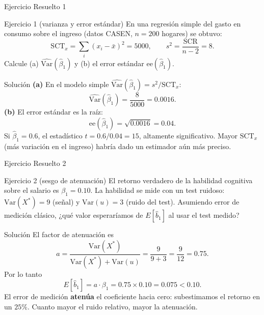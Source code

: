 \documentclass[10pt]{beamer}
\begin{document}
\begin{frame}{Ejercicio Resuelto 1}

\begin{block}{Ejercicio 1 (varianza y error estándar)}
En una regresión simple del gasto en consumo sobre el ingreso (datos CASEN, $n=200$ hogares) se obtuvo:
\[
\text{SCT}_x=\sum_i(x_i-\bar x)^2=5000, \qquad s^2=\frac{\text{SCR}}{n-2}=8.
\]
Calcule (a) $\widehat{\text{Var}}(\hat\beta_1)$ y (b) el error estándar $\text{ee}(\hat\beta_1)$.
\end{block}

\pause

\begin{exampleblock}{Solución}
\textbf{(a)} En el modelo simple $\widehat{\text{Var}}(\hat\beta_1)=s^2/\text{SCT}_x$:
\[
\widehat{\text{Var}}(\hat\beta_1)=\frac{8}{5000}=0.0016.
\]
\textbf{(b)} El error estándar es la raíz:
\[
\text{ee}(\hat\beta_1)=\sqrt{0.0016}=0.04.
\]
Si $\hat\beta_1=0.6$, el estadístico $t=0.6/0.04=15$, altamente significativo. Mayor $\text{SCT}_x$ (más variación en el ingreso) habría dado un estimador aún más preciso.
\end{exampleblock}

\end{frame}

\begin{frame}{Ejercicio Resuelto 2}

\begin{block}{Ejercicio 2 (sesgo de atenuación)}
El retorno verdadero de la habilidad cognitiva sobre el salario es $\beta_1=0.10$. La habilidad se mide con un test ruidoso: $\text{Var}(X^*)=9$ (señal) y $\text{Var}(u)=3$ (ruido del test). Asumiendo error de medición clásico, ¿qué valor esperaríamos de $E[\hat b_1]$ al usar el test medido?
\end{block}

\pause

\begin{exampleblock}{Solución}
El factor de atenuación es
\[
a=\frac{\text{Var}(X^*)}{\text{Var}(X^*)+\text{Var}(u)}=\frac{9}{9+3}=\frac{9}{12}=0.75.
\]
Por lo tanto
\[
E[\hat b_1]=a\cdot\beta_1=0.75\times 0.10=0.075<0.10.
\]
El error de medición \textbf{atenúa} el coeficiente hacia cero: subestimamos el retorno en un $25\%$. Cuanto mayor el ruido relativo, mayor la atenuación.
\end{exampleblock}

\end{frame}
\end{document}
